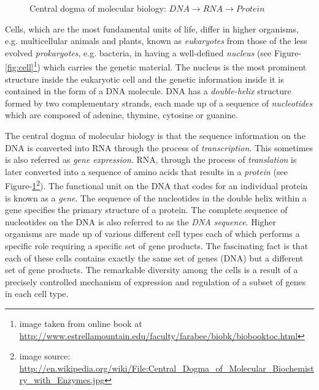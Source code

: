 \begin{figure}
{\begin{center}
 \vspace{0.1in}
 \caption{\label{fig:central_dogma}Central dogma of molecular biology: $DNA \longrightarrow RNA \longrightarrow Protein $}
 \end{center}
 }
 \end{figure}

Cells, which are the most fundamental units of life, differ in higher organisms, e.g. multicellular animals and plants, known as \textit{eukaryotes} from those of the less evolved \textit{prokaryotes}, e.g. bacteria, in having a well-defined \textit{nucleus} (see Figure-\ref{fig:cell}\footnote{image taken from online book at \url{http://www.estrellamountain.edu/faculty/farabee/biobk/biobooktoc.html}}) which carries the genetic material. The nucleus is the most prominent structure inside the eukaryotic cell and the genetic information inside it is contained in the form of a \ac{DNA} molecule. \ac{DNA} has a \textit{double-helix} structure formed by two complementary strands, each made up of a sequence of \textit{nucleotides} which are composed of adenine, thymine, cytosine or guanine. 

The central dogma of molecular biology is that the sequence information on the DNA is converted into \ac{RNA} through the process of \textit{transcription}. This sometimes is also referred as \textit{gene expression}. \ac{RNA}, through the process of \textit{translation} is later converted into a sequence of amino acids that results in a \textit{protein} (see Figure-\ref{fig:central_dogma}\footnote{image source: \url{http://en.wikipedia.org/wiki/File:Central\_Dogma\_of\_Molecular\_Biochemistry\_with\_Enzymes.jpg}}). The functional unit on the DNA that codes for an individual protein is known as a \textit{gene}. The sequence of the nucleotides in the double helix within a gene specifies the primary structure of a protein. The complete sequence of nucleotides on the DNA is also referred to as the \textit{DNA sequence}. 
Higher organisms are made up of various different cell types each of which performs a specific role requiring a specific set of gene products. The fascinating fact is that each of these cells contains exactly the same set of genes (DNA) but a different set of gene products. The remarkable diversity among the cells is a result of a precisely controlled mechanism of expression and regulation of a subset of genes in each cell type. 

